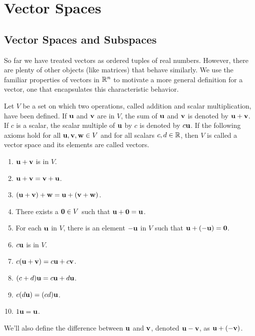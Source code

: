 \documentclass[../m073main.tex]{subfiles}
\begin{document}
\chapter{Vector Spaces}
\section{Vector Spaces and Subspaces}
So far we have treated vectors as ordered tuples of real numbers.
However, there are plenty of other objects (like matrices) that behave similarly.
We use the familiar properties of vectors in $\mathbb{R}^n$ to motivate a more general definition for a vector, one that encapsulates this characteristic behavior.

\begin{definition}
	Let $V$ be a set on which two operations, called addition and scalar multiplication, have been defined.
	If $\mathbf{u}$ and $\mathbf{v}$ are in $V$, the sum of $\mathbf{u}$ and $\mathbf{v}$ is denoted by $\mathbf{u} + \mathbf{v}$.
	If $c$ is a scalar, the scalar multiple of $\mathbf{u}$ by $c$ is denoted by $c \mathbf{u}$.
	If the following axioms hold for all $\mathbf{u}, \mathbf{v}, \mathbf{w} \in V$ and for all scalars $c,d \in \mathbb{R}$, then $V$ is called a vector space and its elements are called vectors.
	\begin{multicols}{2}
		\begin{enumerate}
			\item $\mathbf{u} + \mathbf{v}$ is in $V$.
			\item $\mathbf{u} + \mathbf{v} = \mathbf{v} + \mathbf{u}$.
			\item $(\mathbf{u} + \mathbf{v}) + \mathbf{w} = \mathbf{u} + (\mathbf{v} + \mathbf{w})$.
			\item There exists a $\mathbf{0} \in V$ such that $\mathbf{u} + \mathbf{0} = \mathbf{u}$.
			\item For each $\mathbf{u}$ in $V$, there is an element $-\mathbf{u}$ in $V$ such that $\mathbf{u} + (-\mathbf{u}) = \mathbf{0}$.
			\item $c \mathbf{u}$ is in $V$.
			\item $c(\mathbf{u} + \mathbf{v}) = c \mathbf{u} + c \mathbf{v}$.
			\item $(c + d) \mathbf{u} = c \mathbf{u} + d \mathbf{u}$.
			\item $c(d \mathbf{u}) = (cd) \mathbf{u}$.
			\item $1 \mathbf{u} = \mathbf{u}$.
		\end{enumerate}
	\end{multicols}
	We'll also define the difference between $\mathbf{u}$ and $\mathbf{v}$, denoted $\mathbf{u} - \mathbf{v}$, as $\mathbf{u} + (-\mathbf{v})$.
\end{definition}
\end{document}
